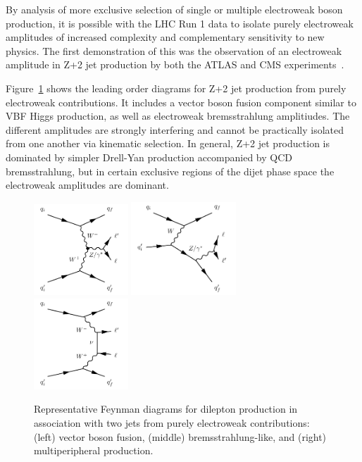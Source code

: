 By analysis of more exclusive selection of single or multiple electroweak boson production,
it is possible with the LHC Run 1 data to isolate purely electroweak amplitudes of
increased complexity and complementary sensitivity to new physics.  The first demonstration of
this was the observation of an electroweak amplitude in Z+2 jet production by both the
ATLAS and CMS experiments~\cite{Aad:2014dta, Khachatryan:2014dea}.

Figure~\ref{fig:ss-exclboson-z2j-sigdiagram} shows the leading order diagrams for Z+2 jet production
from purely electroweak contributions.  It includes a vector boson fusion component similar to
VBF Higgs production, as well as electroweak bremsstrahlung amplitiudes.  The different amplitudes
are strongly interfering and cannot be practically isolated from one another via kinematic selection.
In general, Z+2 jet production is dominated by simpler Drell-Yan production accompanied by QCD bremsstrahlung,
but in certain exclusive regions of the dijet phase space the electroweak amplitudes are dominant.

\begin{figure}[htb] {
\centering
\includegraphics[width=0.315\textwidth]{figures/ss-exclboson-z2j-vbfz_diagram.pdf}
\includegraphics[width=0.35\textwidth]{figures/ss-exclboson-z2j-bckg3_diagram.pdf}
\includegraphics[width=0.315\textwidth]{figures/ss-exclboson-z2j-bckg1_diagram.pdf}
\caption{
Representative Feynman diagrams for dilepton production in association
with two jets from purely electroweak contributions:
(left) vector boson fusion,
(middle) bremsstrahlung-like,
and (right) multiperipheral production.
\label{fig:ss-exclboson-z2j-sigdiagram}}

}
\end{figure}


